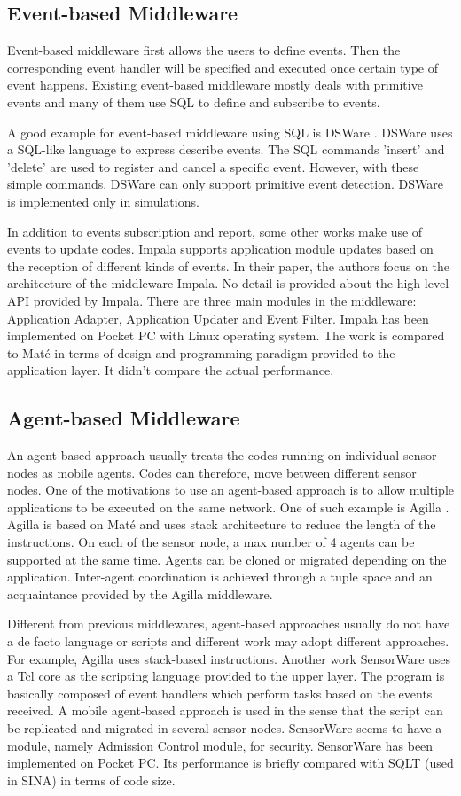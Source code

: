 \subsection{Event-based Middleware}
Event-based middleware first allows the users to define events. Then the corresponding event handler will be specified and executed once certain type of event happens. Existing event-based middleware mostly deals with primitive events and many of them use SQL to define and subscribe to events. 

A good example for event-based middleware using SQL is DSWare \cite{dsware}. DSWare uses a SQL-like language to express describe events. The SQL commands 'insert' and 'delete' are used to register and cancel a specific event. However, with these simple commands, DSWare can only support primitive event detection. DSWare is implemented only in simulations.

In addition to events subscription and report, some other works make use of events to update codes. Impala \cite{impala} supports application module updates based on the reception of different kinds of events. In their paper, the authors focus on the architecture of the middleware Impala. No detail is provided about the high-level API provided by Impala. There are three main modules in the middleware: Application Adapter, Application Updater and Event Filter. Impala has been implemented on Pocket PC with Linux operating system. The work is compared to Mat\'{e} in terms of design and programming paradigm provided to the application layer. It didn't compare the actual performance.

\subsection{Agent-based Middleware}
An agent-based approach usually treats the codes running on individual sensor nodes as mobile agents. Codes can therefore, move between different sensor nodes. One of the motivations to use an agent-based approach is to allow multiple applications to be executed on the same network. One of such example is Agilla \cite{agilla}. Agilla is based on Mat\'{e} and uses stack architecture to reduce the length of the instructions. On each of the sensor node, a max number of 4 agents can be supported at the same time. Agents can be cloned or migrated depending on the application. Inter-agent coordination is achieved through a tuple space and an acquaintance provided by the Agilla middleware.

Different from previous middlewares, agent-based approaches usually do not have a de facto language or scripts and different work may adopt different approaches. For example, Agilla uses stack-based instructions. Another work SensorWare \cite{sensorware} uses a Tcl core as the scripting language provided to the upper layer. The program is basically composed of event handlers which perform tasks based on the events received. A mobile agent-based approach is used in the sense that the script can be replicated and migrated in several sensor nodes. SensorWare seems to have a module, namely Admission Control module, for security. SensorWare has been implemented on Pocket PC. Its performance is briefly compared with SQLT (used in SINA) in terms of code size.

